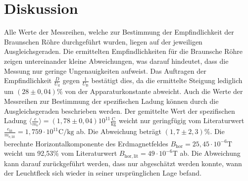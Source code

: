 \section{Diskussion}
\label{sec:Diskussion}
Alle Werte der Messreihen, welche zur Bestimmung der Empfindlichkeit der Braunschen Röhre durchgeführt wurden, liegen auf der jeweiligen Ausgleichsgeraden.
Die ermittelten Empfindlichkeiten für die Braunsche Röhre zeigen untereinander kleine Abweichungen, was darauf hindeutet, dass die Messung nur geringe Ungenauigkeiten aufweist.
Das Auftragen der Empfindlichkeit $\frac{D}{U_\mathrm{d}}$ gegen $\frac{1}{U_\mathrm{B}}$ bestätigt dies, da die ermittelte Steigung lediglich um $(28 \pm 0,04)\%$ von der Apparaturkonstante abweicht.
Auch die Werte der Messreihen zur Bestimmung der spezifischen Ladung können durch die Ausgleichsgeraden beschrieben werden. Der gemittelte Wert der spezifischen Ladung $\langle\frac{e}{m_\mathrm{e}}\rangle=(1,78 \pm 0,04)10^{11} \frac{\si{\coulomb}}{\si{\kilo\gram}}$ weicht nur geringfügig vom Literaturwert $\frac{e_\mathrm{lit}}{m_\mathrm{e, lit}}=1,759 \cdot 10^
{11} \si{\coulomb\per\kilo\gram}$ \cite{formelsammlung} ab. Die Abweichung beträgt $(1,7 \pm 2,3)\%$.
Die  berechnte Horizontalkomponente des Erdmagnetfeldes $B_\mathrm{hor}=25,45 \cdot 10^{-6} \si{\tesla}$ weicht um 92,53\% vom Literaturwert $B_\mathrm{hor,lit}=49 \cdot 10^{-6} \si{\tesla}$ \cite{wolframalpha} ab. Die Abweichung kann darauf zurückgeführt werden, dass nur abgeschätzt werden konnte, wann der Leuchtfleck sich wieder in seiner ursprünglichen Lage befand.
